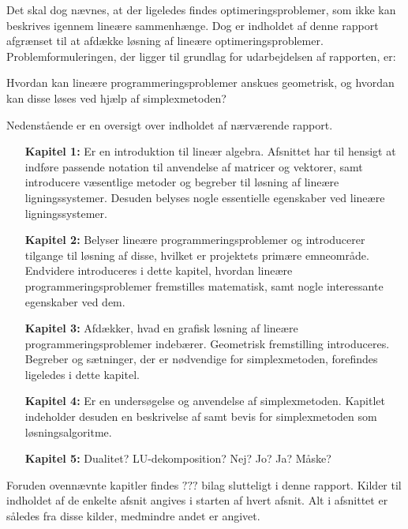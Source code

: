 Det skal dog nævnes, at der ligeledes findes optimeringsproblemer, som ikke kan beskrives igennem lineære sammenhænge. 
Dog er indholdet af denne rapport afgrænset til at afdække løsning af lineære optimeringsproblemer.
%
Problemformuleringen, der ligger til grundlag for udarbejdelsen af rapporten, er: 
%
\begin{col}{}{}
Hvordan kan lineære programmeringsproblemer anskues geometrisk, og hvordan kan disse løses ved hjælp af simplexmetoden?
\end{col}
% 
\noindent
%
Nedenstående er en oversigt over indholdet af nærværende rapport. 
\begin{itemize}[itemindent=4.6em]
\item[\textbf{Kapitel 1:}] Er en introduktion til lineær algebra.
Afsnittet har til hensigt at indføre passende notation til anvendelse af matricer og vektorer, samt introducere væsentlige metoder og begreber til løsning af lineære ligningssystemer. 
Desuden belyses nogle essentielle egenskaber ved lineære ligningssystemer. 
\item[\textbf{Kapitel 2:}] Belyser lineære programmeringsproblemer og introducerer tilgange til løsning af disse, hvilket er projektets primære emneområde. 
Endvidere introduceres i dette kapitel, hvordan lineære programmeringsproblemer fremstilles matematisk, samt nogle interessante egenskaber ved dem.
\item[\textbf{Kapitel 3:}] Afdækker, hvad en grafisk løsning af lineære programmeringsproblemer indebærer. 
Geometrisk fremstilling introduceres. 
Begreber og sætninger, der er nødvendige for simplexmetoden, forefindes ligeledes i dette kapitel. 
\item[\textbf{Kapitel 4:}] Er en undersøgelse og anvendelse af simplexmetoden. 
Kapitlet indeholder desuden en beskrivelse af samt bevis for simplexmetoden som løsningsalgoritme.
\item[\textbf{Kapitel 5:}] Dualitet? LU-dekomposition? Nej? Jo? Ja? Måske? 
\end{itemize}
%
Foruden ovennævnte kapitler findes $???$ bilag slutteligt i denne rapport.
Kilder til indholdet af de enkelte afsnit angives i starten af hvert afsnit. 
Alt i afsnittet er således fra disse kilder, medmindre andet er angivet. 